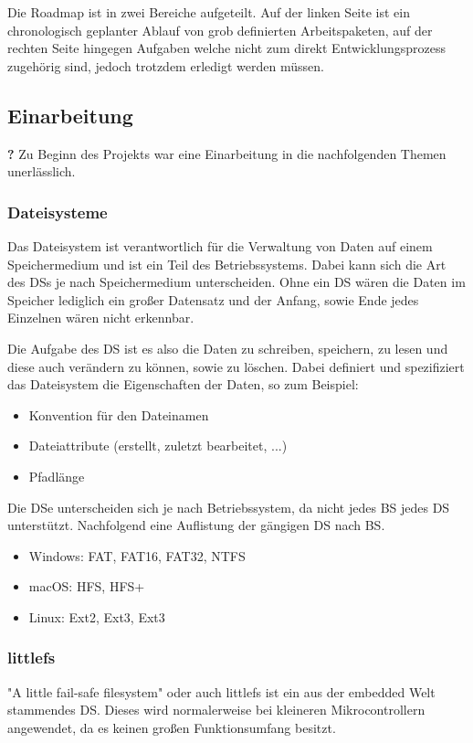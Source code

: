 Die Roadmap ist in zwei Bereiche aufgeteilt.
Auf der linken Seite ist ein chronologisch geplanter Ablauf von grob definierten Arbeitspaketen,
auf der rechten Seite hingegen Aufgaben welche nicht zum direkt Entwicklungsprozess zugehörig sind, jedoch trotzdem erledigt werden müssen.


\subsection{Einarbeitung}
\label{section:einarbeitung}
\textbf{?} Zu Beginn des Projekts war eine Einarbeitung in die nachfolgenden Themen unerlässlich.

\subsubsection{Dateisysteme}
Das Dateisystem ist verantwortlich für die Verwaltung von Daten auf einem Speichermedium und ist ein Teil des Betriebssystems.
Dabei kann sich die Art des \acl{DS}s je nach Speichermedium unterscheiden.
Ohne ein \acl{DS} wären die Daten im Speicher lediglich ein großer Datensatz und der Anfang, sowie Ende jedes Einzelnen wären nicht erkennbar.

Die Aufgabe des \acl{DS} ist es also die Daten zu schreiben, speichern, zu lesen und diese auch verändern zu können, sowie zu löschen.
Dabei definiert und spezifiziert das Dateisystem die Eigenschaften der Daten, so zum Beispiel:
\begin{itemize}
	\item Konvention für den Dateinamen
	\item Dateiattribute (erstellt, zuletzt bearbeitet, ...)
	\item Pfadlänge
\end{itemize}

Die \acl{DS}e unterscheiden sich  je nach Betriebssystem, da nicht jedes \acl{BS} jedes \acl{DS} unterstützt.
Nachfolgend eine Auflistung der gängigen \acl{DS} nach \acl{BS}.
\begin{itemize}
	\item Windows:	FAT, FAT16, FAT32, NTFS
	\item macOS:	HFS, HFS+
	\item Linux:	Ext2, Ext3, Ext3
\end{itemize}



\subsubsection{littlefs}
"A little fail-safe filesystem" oder auch littlefs ist ein aus der embedded Welt stammendes \acl{DS}.
Dieses wird normalerweise bei kleineren Mikrocontrollern angewendet, da es keinen großen Funktionsumfang besitzt.\\

